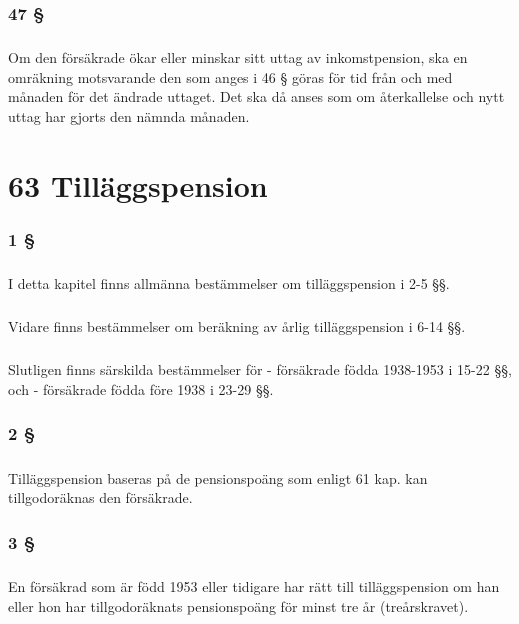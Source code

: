 \documentclass[a4paper,notitlepage,openany,10pt]{book}
\begin{document}
\subsection*{47 §}
\paragraph*{}
Om den försäkrade ökar eller minskar sitt uttag av inkomstpension, ska en omräkning motsvarande den som anges i 46 § göras för tid från och med månaden för det ändrade uttaget. Det ska då anses som om återkallelse och nytt uttag har gjorts den nämnda månaden.
\chapter*{63 Tilläggspension}
\subsection*{1 §}
\paragraph*{}
I detta kapitel finns allmänna bestämmelser om tilläggspension i 2-5 §§.
\paragraph*{}
Vidare finns bestämmelser om beräkning av årlig tilläggspension i 6-14 §§.
\paragraph*{}
Slutligen finns särskilda bestämmelser för
\newline - försäkrade födda 1938-1953 i 15-22 §§, och
\newline - försäkrade födda före 1938 i 23-29 §§.
\subsection*{2 §}
\paragraph*{}
Tilläggspension baseras på de pensionspoäng som enligt 61 kap. kan tillgodoräknas den försäkrade.
\subsection*{3 §}
\paragraph*{}
En försäkrad som är född 1953 eller tidigare har rätt till tilläggspension om han eller hon har tillgodoräknats pensionspoäng för minst tre år (treårskravet).
\end{document}
